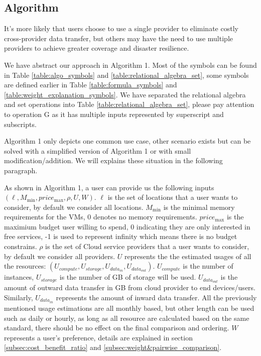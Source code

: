\documentclass[journal]{IEEEtran}
\begin{document}
\subsection{ Algorithm}
\label{subsec:algorithm}
It's more likely that users choose to use a single provider to eliminate costly cross-provider data transfer, but others may have the need to use multiple providers to achieve greater coverage and disaster resilience.

We have abstract our approach in Algorithm 1. Most of the symbols can be found in Table \ref{table:algo_symbols} and \ref{table:relational_algebra_set}, some symbols are defined earlier in Table \ref{table:formula_symbols} and \ref{table:weight_explanation_symbols}. We have separated the relational algebra and set operations into Table \ref{table:relational_algebra_set}, please pay attention to operation G as it has multiple inputs represented by superscript and subscripts. 

Algorithm 1 only depicts one common use case, other scenario exists but can be solved with a simplified version of Algorithm 1 or with small modification/addition. We will explains these situation in the following paragraph.

As shown in Algorithm 1, a user can provide us the following inputs $( \ell , M_{\min } , price_{\max} , \rho , U , W )$. $\ell$ is the set of locations that a user wants to consider, by default we consider all locations. $M_{\min}$ is the minimal memory requirements for the VMs, 0 denotes no memory requirements. $price_{\max}$ is the maximium budget user willing to spend, 0 indicating they are only interested in free services, -1 is used to represent infinity which means there is no budget constrains. $\rho$ is the set of Cloud service providers that a user wants to consider, by default we consider all providers. $U$ represents the the estimated usages of all the resources: $( U_{compute} , U_{storage} , U_{data_{in}} , U_{data_{out}} )$. $U_{compute}$ is the number of instances, $U_{storage}$ is the number of GB of storage will be used. $U_{data_{out}}$ is the amount of outward data transfer in GB from cloud provider to end devices/users. Similarly, $U_{data_{in}}$ represents the amount of inward data transfer. All the previously mentioned usage estimations are all monthly based, but other length can be used such as daily or hourly, as long as all resource are calculated based on the same standard, there should be no effect on the final comparison and ordering. $W$ represents a user's preference, details are explained in section \ref{subsec:cost_benefit_ratio} and \ref{subsec:weight&pairwise_comparison}.
\end{document}
